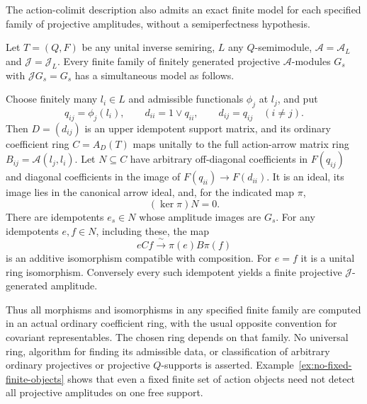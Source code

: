 The action-colimit description also admits an exact finite model for
each specified family of projective amplitudes, without a
semiperfectness hypothesis.

\begin{theorem}
\label{thm:finite-coefficient-models}
Let $T=(Q,F)$ be any unital inverse semiring, $L$ any
$Q$-semimodule, $\mathcal A=\mathcal A_L$ and
$\mathcal J=\mathcal J_L$. Every finite family of finitely
generated projective $\mathcal A$-modules $G_s$ with
$\mathcal JG_s=G_s$ has a simultaneous model as follows.

Choose finitely many $l_i\in L$ and admissible functionals
$\phi_j$ at $l_j$, and put
\[
 q_{ij}=\phi_j(l_i),\qquad
 d_{ii}=1\vee q_{ii},\qquad d_{ij}=q_{ij}\quad(i\ne j).
\]
Then $D=(d_{ij})$ is an upper idempotent support matrix, and its
ordinary coefficient ring $C=A_D(T)$ maps unitally to the full
action-arrow matrix ring $B_{ij}=\mathcal A(l_j,l_i)$.
Let $N\subseteq C$ have arbitrary off-diagonal coefficients in
$F(q_{ij})$ and diagonal coefficients in the image of
$F(q_{ii})\to F(d_{ii})$. It is an ideal, its image lies in the
canonical arrow ideal, and, for the indicated map $\pi$,
\[
 (\ker\pi)N=0.
\]
There are idempotents $e_s\in N$ whose amplitude images are
$G_s$. For any idempotents $e,f\in N$, including these, the map
\[
 eCf\xrightarrow{\ \sim\ }\pi(e)B\pi(f)
\]
is an additive isomorphism compatible with composition. For
$e=f$ it is a unital ring isomorphism. Conversely every such
idempotent yields a finite projective $\mathcal J$-generated
amplitude.
\end{theorem}

Thus all morphisms and isomorphisms in any specified finite family
are computed in an actual ordinary coefficient ring, with the
usual opposite convention for covariant representables. The
chosen ring depends on that family. No universal ring, algorithm
for finding its admissible data, or classification of arbitrary
ordinary projectives or projective $Q$-supports is asserted.
Example~\ref{ex:no-fixed-finite-objects} shows that even a fixed
finite set of action objects need not detect all projective
amplitudes on one free support.


